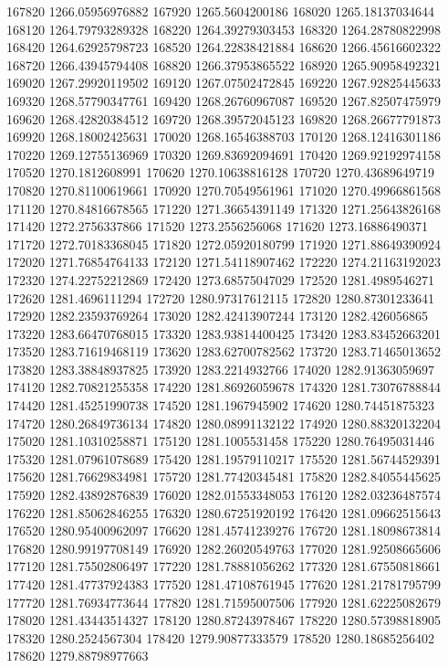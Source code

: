 {167820 1266.05956976882
167920 1265.5604200186
168020 1265.18137034644
168120 1264.79793289328
168220 1264.39279303453
168320 1264.28780822998
168420 1264.62925798723
168520 1264.22838421884
168620 1266.45616602322
168720 1266.43945794408
168820 1266.37953865522
168920 1265.90958492321
169020 1267.29920119502
169120 1267.07502472845
169220 1267.92825445633
169320 1268.57790347761
169420 1268.26760967087
169520 1267.82507475979
169620 1268.42820384512
169720 1268.39572045123
169820 1268.26677791873
169920 1268.18002425631
170020 1268.16546388703
170120 1268.12416301186
170220 1269.12755136969
170320 1269.83692094691
170420 1269.92192974158
170520 1270.1812608991
170620 1270.10638816128
170720 1270.43689649719
170820 1270.81100619661
170920 1270.70549561961
171020 1270.49966861568
171120 1270.84816678565
171220 1271.36654391149
171320 1271.25643826168
171420 1272.2756337866
171520 1273.2556256068
171620 1273.16886490371
171720 1272.70183368045
171820 1272.05920180799
171920 1271.88649390924
172020 1271.76854764133
172120 1271.54118907462
172220 1274.21163192023
172320 1274.22752212869
172420 1273.68575047029
172520 1281.4989546271
172620 1281.4696111294
172720 1280.97317612115
172820 1280.87301233641
172920 1282.23593769264
173020 1282.42413907244
173120 1282.426056865
173220 1283.66470768015
173320 1283.93814400425
173420 1283.83452663201
173520 1283.71619468119
173620 1283.62700782562
173720 1283.71465013652
173820 1283.38848937825
173920 1283.2214932766
174020 1282.91363059697
174120 1282.70821255358
174220 1281.86926059678
174320 1281.73076788844
174420 1281.45251990738
174520 1281.1967945902
174620 1280.74451875323
174720 1280.26849736134
174820 1280.08991132122
174920 1280.88320132204
175020 1281.10310258871
175120 1281.1005531458
175220 1280.76495031446
175320 1281.07961078689
175420 1281.19579110217
175520 1281.56744529391
175620 1281.76629834981
175720 1281.77420345481
175820 1282.84055445625
175920 1282.43892876839
176020 1282.01553348053
176120 1282.03236487574
176220 1281.85062846255
176320 1280.67251920192
176420 1281.09662515643
176520 1280.95400962097
176620 1281.45741239276
176720 1281.18098673814
176820 1280.99197708149
176920 1282.26020549763
177020 1281.92508665606
177120 1281.75502806497
177220 1281.78881056262
177320 1281.67550818661
177420 1281.47737924383
177520 1281.47108761945
177620 1281.21781795799
177720 1281.76934773644
177820 1281.71595007506
177920 1281.62225082679
178020 1281.43443514327
178120 1280.87243978467
178220 1280.57398818905
178320 1280.2524567304
178420 1279.90877333579
178520 1280.18685256402
178620 1279.88798977663
}
